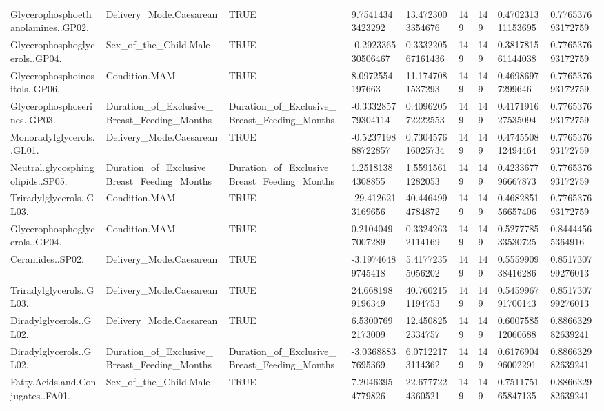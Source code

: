 \begin{longtable}{lllllllll}
Glycerophosphoethanolamines..GP02. & Delivery\_Mode.Caesarean & TRUE & 9.75414343423292 & 13.4723003354676 & 149 & 149 & 0.470231311153695 & 0.776537693172759 \\
Glycerophosphoglycerols..GP04. & Sex\_of\_the\_Child.Male & TRUE & -0.292336530506467 & 0.333220567161436 & 149 & 149 & 0.381781561144038 & 0.776537693172759 \\
Glycerophosphoinositols..GP06. & Condition.MAM & TRUE & 8.0972554197663 & 11.1747081537293 & 149 & 149 & 0.46986977299646 & 0.776537693172759 \\
Glycerophosphoserines..GP03. & Duration\_of\_Exclusive\_Breast\_Feeding\_Months & Duration\_of\_Exclusive\_Breast\_Feeding\_Months & -0.333285779304114 & 0.409620572222553 & 149 & 149 & 0.417191627535094 & 0.776537693172759 \\
Monoradylglycerols..GL01. & Delivery\_Mode.Caesarean & TRUE & -0.523719888722857 & 0.730457616025734 & 149 & 149 & 0.474550812494464 & 0.776537693172759 \\
Neutral.glycosphingolipids..SP05. & Duration\_of\_Exclusive\_Breast\_Feeding\_Months & Duration\_of\_Exclusive\_Breast\_Feeding\_Months & 1.25181384308855 & 1.55915611282053 & 149 & 149 & 0.423367796667873 & 0.776537693172759 \\
Triradylglycerols..GL03. & Condition.MAM & TRUE & -29.4126213169656 & 40.4464994784872 & 149 & 149 & 0.468285156657406 & 0.776537693172759 \\
Glycerophosphoglycerols..GP04. & Condition.MAM & TRUE & 0.21040497007289 & 0.33242632114169 & 149 & 149 & 0.527778533530725 & 0.84444565364916 \\
Ceramides..SP02. & Delivery\_Mode.Caesarean & TRUE & -3.19746489745418 & 5.41772355056202 & 149 & 149 & 0.555990938416286 & 0.851730799276013 \\
Triradylglycerols..GL03. & Delivery\_Mode.Caesarean & TRUE & 24.6681989196349 & 40.7602151194753 & 149 & 149 & 0.545996791700143 & 0.851730799276013 \\
Diradylglycerols..GL02. & Delivery\_Mode.Caesarean & TRUE & 6.53007692173009 & 12.4508252334757 & 149 & 149 & 0.600758512060688 & 0.886632982639241 \\
Diradylglycerols..GL02. & Duration\_of\_Exclusive\_Breast\_Feeding\_Months & Duration\_of\_Exclusive\_Breast\_Feeding\_Months & -3.03688837695369 & 6.07122173114362 & 149 & 149 & 0.617690496002291 & 0.886632982639241 \\
Fatty.Acids.and.Conjugates..FA01. & Sex\_of\_the\_Child.Male & TRUE & 7.20463954779826 & 22.6777224360521 & 149 & 149 & 0.751175165847135 & 0.886632982639241 \\

\end{longtable}

